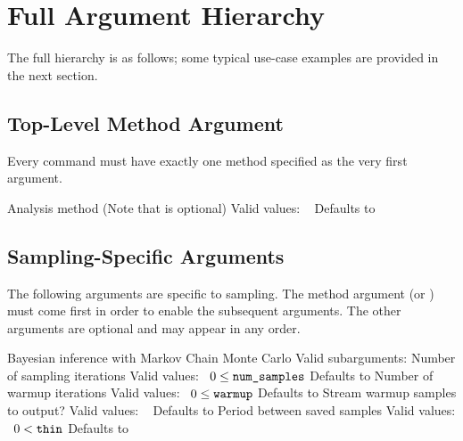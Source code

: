 \section{Full Argument Hierarchy}

The full hierarchy is as follows; some typical use-case examples are
provided in the next section.

\subsection{Top-Level Method Argument}

Every command must have exactly one method specified as the very first
argument.  

\begin{description}
  {Analysis method (Note that  is optional)}
  {Valid values: \  }
  {Defaults to }
\end{description}

\subsection{Sampling-Specific Arguments}

The following arguments are specific to sampling.  The method argument
 (or ) must come first in order to
enable the subsequent arguments.  The other arguments are optional and
may appear in any order.

\begin{description}
    {Bayesian inference with Markov Chain Monte Carlo}
    {Valid subarguments: 
      }
%
      {Number of sampling iterations}
      {Valid values: \  $0 \leq \mbox{{\tt num\_samples}}$}
      {Defaults to }
%
      {Number of warmup iterations}
      {Valid values: \  $0 \leq \mbox{{\tt warmup}}$}
      {Defaults to }
%
      {Stream warmup samples to output?}
      {Valid values: \ }
      {Defaults to }
%
      {Period between saved samples}
      {Valid values: \  $0 < \mbox{{\tt thin}}$}
      {Defaults to }
%
\end{description}

